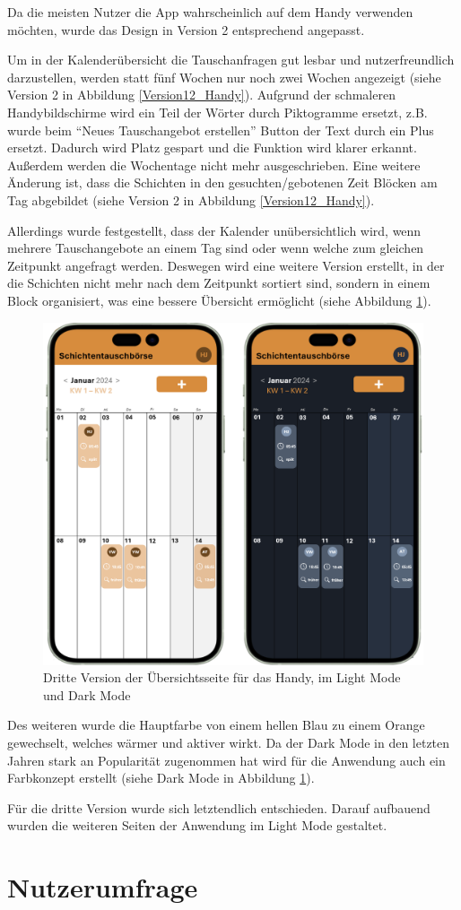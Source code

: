 Da die meisten Nutzer die App wahrscheinlich auf dem Handy verwenden möchten, wurde das Design in Version 2 entsprechend angepasst.

Um in der Kalenderübersicht die Tauschanfragen gut lesbar und nutzerfreundlich darzustellen, werden statt fünf Wochen nur noch zwei Wochen angezeigt (siehe Version 2 in Abbildung \ref{Version12_Handy}). 
Aufgrund der schmaleren Handybildschirme wird ein Teil der Wörter durch Piktogramme ersetzt, z.B. wurde beim “Neues Tauschangebot erstellen” Button der Text durch ein Plus ersetzt. Dadurch wird Platz gespart und die Funktion wird klarer erkannt. 
Außerdem werden die Wochentage nicht mehr ausgeschrieben. Eine weitere Änderung ist, dass die Schichten in den gesuchten/gebotenen Zeit Blöcken am Tag abgebildet (siehe Version 2 in Abbildung \ref{Version12_Handy}).

Allerdings wurde festgestellt, dass der Kalender unübersichtlich wird, wenn mehrere Tauschangebote an einem Tag sind oder wenn welche zum gleichen Zeitpunkt angefragt werden. 
Deswegen wird eine weitere Version erstellt, in der die Schichten nicht mehr nach dem Zeitpunkt sortiert sind, sondern in einem Block organisiert, was eine bessere Übersicht ermöglicht (siehe Abbildung \ref{Version3_Handy}).

\begin{figure}[h]
    \centering
    \includegraphics[clip,width=0.75\linewidth]{images/Version3_Handy.png}
    \caption[Dritte Version der Übersichtsseite für das Handy, im Light Mode und Dark Mode]{Dritte Version der Übersichtsseite für das Handy, im Light Mode und Dark Mode}
    \label{Version3_Handy}
\end{figure}

Des weiteren wurde die Hauptfarbe von einem hellen Blau zu einem Orange gewechselt, welches wärmer und aktiver wirkt. Da der Dark Mode in den letzten Jahren stark an Popularität zugenommen hat \cite{diva2020darkmode} wird für die Anwendung auch ein Farbkonzept erstellt (siehe Dark Mode in Abbildung \ref{Version3_Handy}). 

Für die dritte Version wurde sich letztendlich entschieden. Darauf aufbauend wurden die weiteren Seiten der Anwendung im Light Mode gestaltet.

\section{Nutzerumfrage}
